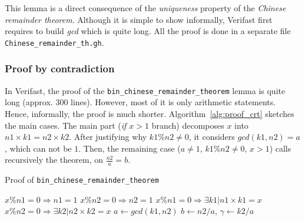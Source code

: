 \documentclass[oneside]{article}
\begin{document}
This lemma is a direct consequence of the \emph{uniqueness} property of the \emph{Chinese remainder theorem}. Although it is simple to show informally, Verifast first requires to build \emph{gcd} which is quite long. All the proof is done in a separate file \texttt{Chinese\_remainder\_th.gh}. 

\subsubsection{Proof by contradiction}
In Verifast, the proof of the \texttt{bin\_chinese\_remainder\_theorem} lemma is quite long (approx. 300 lines). However, most of it is only arithmetic statements. Hence, informally, the proof is much shorter. Algorithm~\ref{alg:proof_crt} sketches the main cases. The main part (\emph{if $x > 1$} branch) decomposes $x$ into $n1\times k1 = n2\times k2$. After justifying why $k1\%n2 \neq 0$, it considers $gcd(k1, n2) = a$, which can not be $1$. Then, the remaining case ($a \neq 1$, $k1\%n2 \neq 0$, $x > 1$) calls recursively the theorem, on $\frac{n2}{a} = b$.
\begin{algorithm}
	\caption{Proof of \texttt{bin\_chinese\_remainder\_theorem}\label{alg:proof_crt}}
	{
		$x\%n1 = 0 \Rightarrow n1 = 1$\;
		$x\%n2 = 0 \Rightarrow n2 = 1$\;
		\;
		\;
		\Contradiction\;
	}
	{
		$x\%n1 = 0 \Rightarrow \exists k1 | n1\times k1 = x$ \;
		$x\%n2 = 0 \Rightarrow \exists k2 | n2\times k2 = x$ \;
		\;
		{
			$a \longleftarrow gcd(k1, n2)$\;
			$b \longleftarrow n2/a$, \;
			$\gamma \longleftarrow k2/a$\;
			\;
		}
	}
\end{algorithm}
\end{document}
